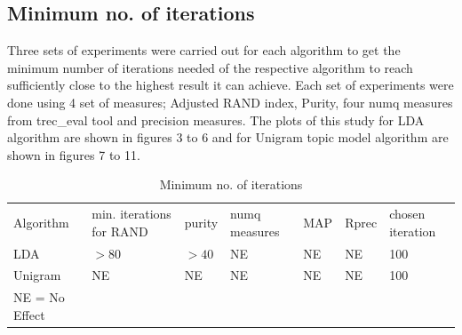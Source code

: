 \subsection{Minimum no. of iterations} Three sets of experiments were carried out for each algorithm to get the minimum number of iterations needed of the respective algorithm to reach sufficiently close to the highest result it can achieve. Each set of experiments were done using 4 set of measures; Adjusted RAND index, Purity, four numq measures from trec\_eval tool and precision measures. The plots of this study for LDA algorithm are shown in figures 3 to 6 and for Unigram topic model algorithm are shown in figures 7 to 11.
\begin{table}
\caption{Minimum no. of iterations}
\label{tab:iter}       %
\begin{tabular}{lllllll}
\hline\noalign{\smallskip}
Algorithm & min. iterations for RAND & purity & numq measures & MAP & Rprec & chosen iteration  \\
\noalign{\smallskip}\hline\noalign{\smallskip}
LDA & $ >80$ & $ >40$ & NE & NE & NE & 100 \\
Unigram & NE & NE & NE & NE & NE & 100 \\
\noalign{\smallskip}\hline
NE = No Effect
\end{tabular}
\end{table}


